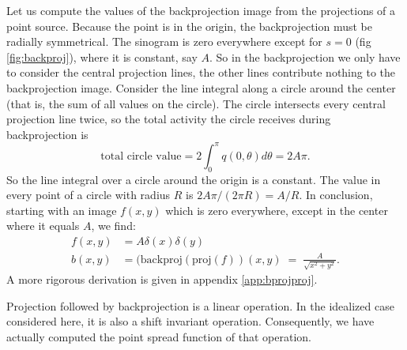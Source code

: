 \documentclass[11pt,oneside]{article}
\begin{document}
Let us compute the values of the backprojection image from the
projections of a point source. Because the point is in the origin, the
backprojection must be radially symmetrical. The sinogram is zero
everywhere except for $s = 0$ (fig \ref{fig:backproj}), where it is
constant, say $A$. So in the backprojection we only have to consider the
central projection lines, the other lines contribute nothing to the
backprojection image.  Consider the line integral along a circle
around the center (that is, the sum of all values on the circle). The
circle intersects every central projection line twice, so the total
activity the circle receives during backprojection is
\begin{equation}
  \mbox{total circle value} = 2 \int_0^\pi q(0, \theta) d \theta = 2 A\pi.
  \label{eq:bprojvalue}
\end{equation}
So the line integral over a circle around the origin is a constant. The value
in every point of a circle with radius $R$ is $2 A \pi / (2 \pi R) =
A/R$. In conclusion, starting with an image $f(x,y)$ which is zero everywhere,
except in the center where it equals $A$, we find:
\begin{align}
  f(x,y) &= A \delta(x) \delta(y)\\
 b(x,y) &= (\mbox{backproj}(\mbox{proj}(f))(x,y) \; = \;
  \frac{A}{\sqrt{x^2 + y^2}}.
\end{align}
A more rigorous derivation is given in appendix \ref{app:bprojproj}.

Projection followed by backprojection is a linear operation. In the
idealized case considered here, it is also a shift invariant
operation. Consequently, we have actually computed the point spread function
of that operation.
\end{document}

